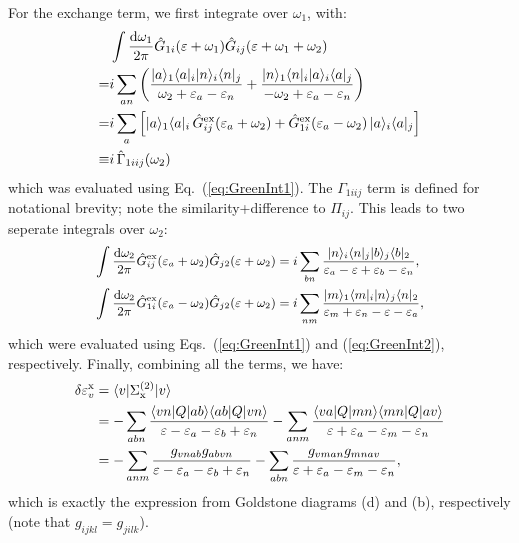 \documentclass[10pt,twocolumn,a4paper]{article}%
\newcommand{\bra}[1]{\ensuremath{\langle #1|}}	%
\newcommand{\ket}[1]{\ensuremath{|#1\rangle}}	%
\def\d{\ensuremath{{\rm d}}}
\def\en{\ensuremath{\varepsilon}}
\newcommand{\w}{\ensuremath{\omega}}
\begin{document}
For the exchange term, we first integrate over $\w_1$, with:
\begin{align}
&\int\frac{\d\w_1}{2\pi}
\hat G_{1i}(\en+\w_1) \hat G_{ij}(\en+\w_1+\w_2)
\notag\\
=& i\sum_{an}\left(
\frac{\ket{a}_1\bra{a}_i\ket{n}_i\bra{n}_j}{\w_2+\en_a-\en_n}+\frac{\ket{n}_1\bra{n}_i\ket{a}_i\bra{a}_j}{-\w_2+\en_a-\en_n}
\right)
\notag\\
\label{eq:ExchInt1}
= & i\sum_{a}\left[
\ket{a}_1\bra{a}_i \, \hat G^{\rm ex}_{ij}(\en_a+\w_2)+ \hat G^{\rm ex}_{1i}(\en_a-\w_2) \, \ket{a}_i\bra{a}_j
\right]\\
\equiv & i \, \hat\Gamma_{1iij}(\w_2)
\label{eq:ExchInt1-Gamma}
\end{align}
which was evaluated using Eq.~(\ref{eq:GreenInt1}).
The $\Gamma_{1iij}$ term is defined for notational brevity; note the similarity+difference to $\Pi_{ij}$.
This leads to two seperate integrals over $\w_2$:\
\begin{align}
\small
\begin{split}
\int \frac{\d \w_2}{2\pi}\hat G^{\rm ex}_{ij}(\en_a+\w_2) \hat G_{j2}(\en+\omega_2)
&=
i\sum_{bn}
\frac{\ket{n}_i\bra{n}_j \ket{b}_j\bra{b}_2}{\en_a - \en + \en_b - \en_n},
\\
\int \frac{\d \w_2}{2\pi}\hat G^{\rm ex}_{1i}(\en_a-\w_2) \hat G_{j2}(\en+\omega_2)
&=
i\sum_{nm}
\frac{\ket{m}_1\bra{m}_i\ket{n}_j\bra{n}_2 }{\en_m + \en_n-\en - \en_a },
\end{split}
\end{align}
which were evaluated using Eqs.~(\ref{eq:GreenInt1}) and (\ref{eq:GreenInt2}), respectively.
%
Finally, combining all the terms, we have:
\begin{align}
\delta\en_v^{\rm x}&=\bra{v}\Sigma^{(2)}_{\rm x}\ket{v} \notag\\
&=-\sum_{abn}\frac{\bra{vn}Q\ket{ab} \bra{ab}Q\ket{vn}}{\en-\en_a-\en_b+\en_n}
-\sum_{anm}\frac{\bra{va}Q\ket{mn} \bra{mn}Q\ket{av}}{\en+\en_a-\en_m-\en_n} \notag\\
&=-\sum_{anm}\frac{g_{vnab}g_{abvn}}{\en-\en_a-\en_b+\en_n}
-\sum_{abn}\frac{g_{vman}g_{mnav}}{\en+\en_a-\en_m-\en_n},
\end{align}
which is exactly the expression from Goldstone diagrams (d) and (b), respectively (note that $g_{ijkl}=g_{jilk}$).
\end{document}
